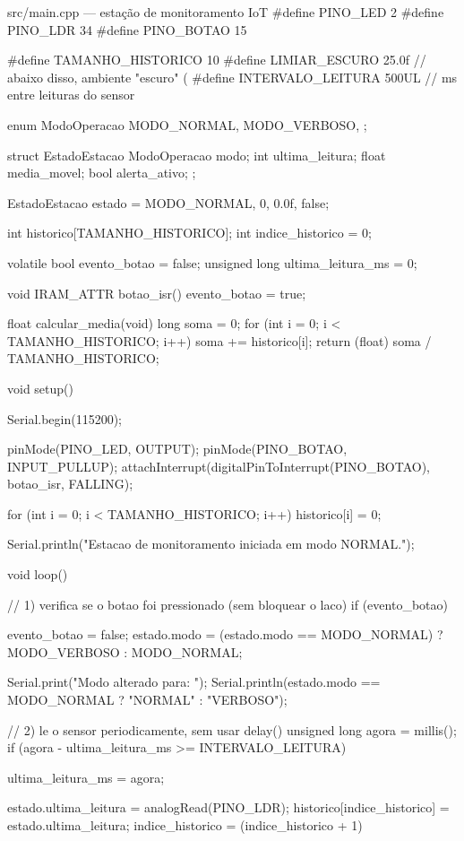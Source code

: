 \begin{codigoc}{src/main.cpp — estação de monitoramento IoT}
#define PINO_LED    2
#define PINO_LDR    34
#define PINO_BOTAO  15

#define TAMANHO_HISTORICO   10
#define LIMIAR_ESCURO       25.0f   // abaixo disso, ambiente "escuro" (%
#define INTERVALO_LEITURA   500UL   // ms entre leituras do sensor

enum ModoOperacao {
    MODO_NORMAL,
    MODO_VERBOSO,
};

struct EstadoEstacao {
    ModoOperacao modo;
    int ultima_leitura;
    float media_movel;
    bool alerta_ativo;
};

EstadoEstacao estado = {MODO_NORMAL, 0, 0.0f, false};

int historico[TAMANHO_HISTORICO];
int indice_historico = 0;

volatile bool evento_botao = false;
unsigned long ultima_leitura_ms = 0;

void IRAM_ATTR botao_isr() {
    evento_botao = true;
}

float calcular_media(void) {
    long soma = 0;
    for (int i = 0; i < TAMANHO_HISTORICO; i++) {
        soma += historico[i];
    }
    return (float) soma / TAMANHO_HISTORICO;
}

void setup() {
    Serial.begin(115200);

    pinMode(PINO_LED, OUTPUT);
    pinMode(PINO_BOTAO, INPUT_PULLUP);
    attachInterrupt(digitalPinToInterrupt(PINO_BOTAO), botao_isr, FALLING);

    for (int i = 0; i < TAMANHO_HISTORICO; i++) {
        historico[i] = 0;
    }

    Serial.println("Estacao de monitoramento iniciada em modo NORMAL.");
}

void loop() {
    // 1) verifica se o botao foi pressionado (sem bloquear o laco)
    if (evento_botao) {
        evento_botao = false;
        estado.modo = (estado.modo == MODO_NORMAL) ? MODO_VERBOSO : MODO_NORMAL;

        Serial.print("Modo alterado para: ");
        Serial.println(estado.modo == MODO_NORMAL ? "NORMAL" : "VERBOSO");
    }

    // 2) le o sensor periodicamente, sem usar delay()
    unsigned long agora = millis();
    if (agora - ultima_leitura_ms >= INTERVALO_LEITURA) {
        ultima_leitura_ms = agora;

        estado.ultima_leitura = analogRead(PINO_LDR);
        historico[indice_historico] = estado.ultima_leitura;
        indice_historico = (indice_historico + 1) %

}}
\end{codigoc}
